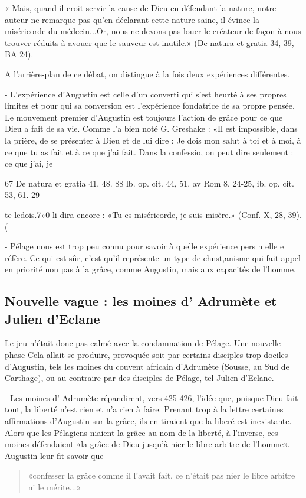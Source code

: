« Mais, quand il croit servir la cause de Dieu en défendant la nature, notre auteur ne remarque pas qu'en déclarant cette nature saine, il évince la miséricorde du médecin...Or, nous ne devons pas louer le créateur de façon à nous trouver réduits à avouer que le sauveur est inutile.» (De natura et gratia 34, 39, BA 24).

A l'arrière-plan de ce débat, on distingue à la fois deux  expériences différentes.

-	L'expérience d'Augustin est celle d'un converti qui s'est heurté à ses propres limites et pour qui sa conversion est l'expérience fondatrice de sa propre pensée. Le mouvement premier d'Augustin est toujours l'action de grâce pour ce que Dieu a fait de sa vie. Comme l'a bien noté G. Greshake : «Il est impossible, dans la prière, de se présenter à Dieu et de lui dire : Je dois mon salut à toi et à moi, à ce que tu as fait et à ce que j'ai fait. Dans la confessio, on peut dire seulement : ce que j'ai, je



67  De natura et gratia 41, 48.
88 lb. op. cit. 44, 51.
av Rom 8, 24-25, ib. op. cit. 53, 61.
29
 
te ledois.7»0	li dira encore : «Tu es miséricorde, je suis misère.» (Conf. X, 28, 39).	(

-  Pélage nous est  trop peu  connu pour savoir à quelle expérience pers n elle    e réfère. Ce qui est sûr, c'est qu'il représente un type de chnst,anisme qui fait appel en priorité non pas à la grâce, comme Augustin, mais aux capacités de l'homme.

\subsection{Nouvelle vague : les moines d' Adrumète et Julien d'Eclane}
 

Le jeu n'était donc pas calmé avec la condamnation de Pélage. Une nouvelle phase	Cela
allait se produire,	provoquée soit par certains disciples trop dociles d'Augustin, tels
les	moines du couvent africain d'Adrumète (Sousse, au Sud de Carthage), ou au
contraire par des disciples de Pélage, tel Julien d'Eclane.

- Les moines d' Adrumète répandirent, vers 425-426, l'idée que, puisque Dieu fait tout, la liberté n'est rien et n'a rien à faire. Prenant trop à la lettre certaines affirmations d'Augustin sur la grâce, ils en tiraient que la liberé est inexistante. Alors que les Pélagiens niaient la grâce au nom de la liberté, à l'inverse, ces moines défendaient «la grâce de Dieu jusqu'à nier le libre arbitre de l'homme». Augustin leur fit savoir que 
\begin{quote}
    «confesser la grâce comme il l'avait fait, ce n'était pas nier le libre arbitre ni le mérite...» 
    \end{quote}
    
